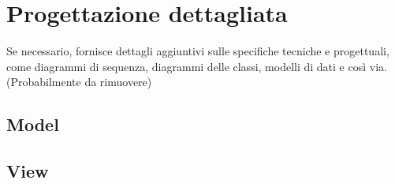 \section{Progettazione dettagliata}\label{sec:Progettazione}
 Se necessario, fornisce dettagli aggiuntivi sulle specifiche tecniche e progettuali, come diagrammi di sequenza, diagrammi delle classi, modelli di dati e così via. (Probabilmente da rimuovere)
 
 \subsection{Model}\label{ssec:Model}
 \subsection{View}\label{ssec:View}

 \newpage